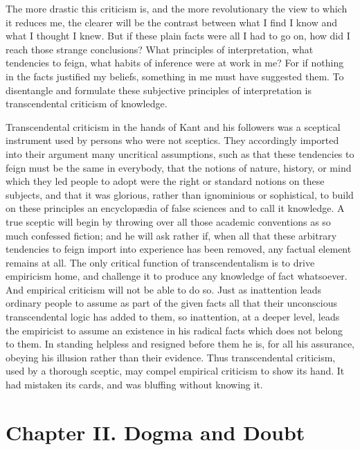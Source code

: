 The more drastic this criticism is, and the more revolutionary
the view to which it reduces me, the clearer will be the contrast
between what I find I know and what I thought I knew. But if these
plain facts were all I had to go on, how did I reach those strange
conclusions? What principles of interpretation, what tendencies to
feign, what habits of inference were at work in me? For if nothing in
the facts justified my beliefs, something in me must have suggested
them. To disentangle and formulate these subjective principles of
interpretation is transcendental criticism of knowledge.

Transcendental criticism in the hands of Kant and his followers was a
sceptical instrument used by persons who were not sceptics. They
accordingly imported into their argument many uncritical assumptions,
such as that these tendencies to feign must be the same in everybody,
that the notions of nature, history, or mind which they led people to
adopt were the right or standard notions on these subjects, and that
it was glorious, rather than ignominious or sophistical, to build on
these principles an encyclop\ae dia of false sciences and to call it
knowledge. A true sceptic will begin by throwing over all those
academic conventions as so much confessed fiction; and he will ask
rather if, when all that these arbitrary tendencies to feign import
into experience has been removed, any factual element remains at all.
The only critical function of transcendentalism is to drive empiricism
home, and challenge it to produce any knowledge of fact whatsoever.
And empirical criticism will not be able to do so. Just as inattention
leads ordinary people to assume as part of the given facts all that
their unconscious transcendental logic has added to them, so
inattention, at a deeper level, leads the empiricist to assume an
existence in his radical facts which does not belong to them. In
 standing helpless and resigned before them he is, for all his
assurance, obeying his illusion rather than their evidence. Thus
transcendental criticism, used by a thorough sceptic, may compel
empirical criticism to show its hand. It had mistaken its cards, and
was bluffing without knowing it.

\section{Chapter II. Dogma and Doubt}

